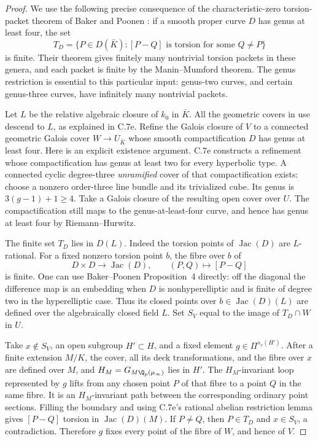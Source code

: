 \begin{proof}
We use the following precise consequence of the characteristic-zero
torsion-packet theorem of Baker and Poonen
\cite[Theorem~2, printed p.~110; proof pp.~111--114]{BC_BakerPoonen2001}:
if a smooth proper curve $D$ has genus at least four, the set
\[
 T_D=\{P\in D(\bar K): [P-Q]\text{ is torsion for some }Q\ne P\}
                                                               \tag{C.7f.1}
\]
is finite. Their theorem gives finitely many nontrivial torsion
packets in these genera, and each packet is finite by the
Manin--Mumford theorem. The genus restriction is essential to this
particular input: genus-two curves, and certain genus-three curves,
have infinitely many nontrivial packets.

Let $L$ be the relative algebraic closure of $k_0$ in $\bar K$.
All the geometric covers in use descend to $L$, as explained in
C.7e. Refine the Galois closure of $V$ to a connected geometric
Galois cover $W\to U_{\bar K}$ whose smooth compactification $D$
has genus at least four. Here is an explicit existence argument.
C.7e constructs a refinement whose compactification has genus at
least two for every hyperbolic type. A connected cyclic degree-three
\emph{unramified} cover of that compactification exists: choose a
nonzero order-three line bundle and its trivialized cube. Its genus
is $3(g-1)+1\ge4$. Take a Galois closure of the resulting open
cover over $U$. The compactification still maps to the genus-at-least-four
curve, and hence has genus at least four by Riemann--Hurwitz.

The finite set $T_D$ lies in $D(L)$. Indeed the torsion points of
$\operatorname{Jac}(D)$ are $L$-rational. For a fixed nonzero torsion
point $b$, the fibre over $b$ of
\[
       D\times D\longrightarrow\operatorname{Jac}(D),\qquad
                       (P,Q)\longmapsto[P-Q]
\]
is finite. One can use Baker--Poonen Proposition~4 directly:
off the diagonal the difference map is an embedding when $D$ is
nonhyperelliptic and is finite of degree two in the hyperelliptic
case. Thus its closed points over $b\in\operatorname{Jac}(D)(L)$
are defined over the algebraically closed field $L$.
Set $S_V$ equal to the image of $T_D\cap W$ in $U$.

Take $x\notin S_V$, an open subgroup $H'\subset H$, and a fixed
element $g\in\Pi^{s_x(H')}$. After a finite extension $M/K$, the
cover, all its deck transformations, and the fibre over $x$ are
defined over $M$, and $H_M=G_{M\Q_p(\mu_\infty)}$ lies in $H'$.
The $H_M$-invariant loop represented by $g$ lifts from any chosen
point $P$ of that fibre to a point $Q$ in the same fibre. It is an
$H_M$-invariant path between the corresponding ordinary point
sections. Filling the boundary and using C.7e's rational abelian
restriction lemma gives $[P-Q]$ torsion in
$\operatorname{Jac}(D)(M)$. If $P\ne Q$, then $P\in T_D$ and
$x\in S_V$, a contradiction. Therefore $g$ fixes every point of
the fibre of $W$, and hence of $V$.


\end{proof}
